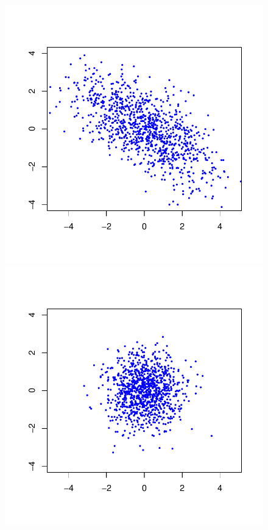 \documentclass{article}
\begin{document}
\subsection{}
\subsection{}

\newcommand{\sscale}{0.5}
\begin{figure}\centering
	\includegraphics[scale=\sscale]{scatter1}
	\includegraphics[scale=\sscale]{scatter2}


\end{figure}
\end{document}
